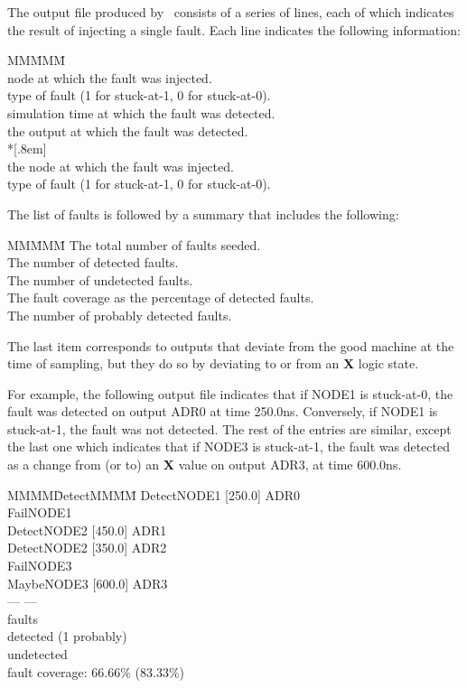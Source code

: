 The output file produced by \ifsim\ consists of a series of lines, each of
which indicates the result of injecting a single fault.  Each line indicates
the following information:

\begin{tabbing}
MM\=MMM\= \kill
{} \\
\>\>\BU node at which the fault was injected. \\
\>\>\BU type of fault (1 for stuck-at-1, 0 for stuck-at-0). \\
\>\>\BU simulation time at which the fault was detected. \\
\>\>\BU the output at which the fault was detected. \\*[.8em]
 \\
\>\>\BU the node at which the fault was injected. \\
\>\>\BU type of fault (1 for stuck-at-1, 0 for stuck-at-0). \\
\end{tabbing}

\noindent The list of faults is followed by a summary that includes the
following:

\begin{tabbing}
MM\=MMM\= \kill
\>\BU The total number of faults seeded. \\
\>\BU The number of detected faults. \\
\>\BU The number of undetected faults. \\
\>\BU The fault coverage as the percentage of detected faults. \\
\>\BU The number of probably detected faults. \\
\end{tabbing}

The last item corresponds to outputs that deviate from the good machine at
the time of sampling, but they do so by deviating to or from an {\bf X}
logic state.

For example, the following output file indicates that if NODE1 is
stuck-at-0, the fault was detected on output ADR0 at time 250.0ns.
Conversely, if NODE1 is stuck-at-1, the fault was not detected.  The rest of
the entries are similar, except the last one which indicates that if NODE3
is stuck-at-1, the fault was detected as a change from (or to) an {\bf X}
value on output ADR3, at time 600.0ns.

\begin{tabbing}
MMMM\=DetectMM\=MM\= \kill
\>Detect\>NODE1 [250.0] ADR0 \\
\>Fail\>NODE1 \\
\>Detect\>NODE2 [450.0] ADR1 \\
\>Detect\>NODE2 [350.0] ADR2 \\
\>Fail\>NODE3 \\
\>Maybe\>NODE3 [600.0] ADR3 \\
\>--- --- \\
 faults \\
 detected (1 probably) \\
 undetected \\
\>fault coverage: 66.66\% (83.33\%) \\
\end{tabbing}

